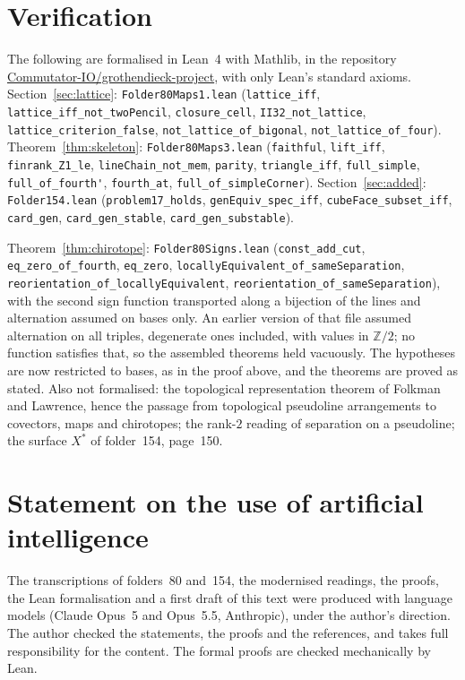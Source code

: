 \documentclass[11pt,a4paper]{amsart}
\theoremstyle{definition}
\theoremstyle{remark}
\begin{document}
\section{Verification}\label{sec:lean}
\begingroup\sloppy
The following are formalised in Lean~4 with Mathlib, in the repository \href{https://github.com/Commutator-IO/grothendieck-project}{Commutator-IO/grothendieck-project}, with only Lean's standard axioms. Section~\ref{sec:lattice}: \nolinkurl{Folder80Maps1.lean} (\nolinkurl{lattice_iff}, \nolinkurl{lattice_iff_not_twoPencil}, \nolinkurl{closure_cell}, \nolinkurl{II32_not_lattice}, \nolinkurl{lattice_criterion_false}, \nolinkurl{not_lattice_of_bigonal}, \nolinkurl{not_lattice_of_four}). Theorem~\ref{thm:skeleton}: \nolinkurl{Folder80Maps3.lean} (\nolinkurl{faithful}, \nolinkurl{lift_iff}, \nolinkurl{finrank_Z1_le}, \nolinkurl{lineChain_not_mem}, \nolinkurl{parity}, \nolinkurl{triangle_iff}, \nolinkurl{full_simple}, \nolinkurl{full_of_fourth'}, \nolinkurl{fourth_at}, \nolinkurl{full_of_simpleCorner}). Section~\ref{sec:added}: \nolinkurl{Folder154.lean} (\nolinkurl{problem17_holds}, \nolinkurl{genEquiv_spec_iff}, \nolinkurl{cubeFace_subset_iff}, \nolinkurl{card_gen}, \nolinkurl{card_gen_stable}, \nolinkurl{card_gen_substable}).

Theorem~\ref{thm:chirotope}: \nolinkurl{Folder80Signs.lean} (\nolinkurl{const_add_cut}, \nolinkurl{eq_zero_of_fourth}, \nolinkurl{eq_zero}, \nolinkurl{locallyEquivalent_of_sameSeparation}, \nolinkurl{reorientation_of_locallyEquivalent}, \nolinkurl{reorientation_of_sameSeparation}), with the second sign function transported along a bijection of the lines and alternation assumed on bases only. An earlier version of that file assumed alternation on all triples, degenerate ones included, with values in $\mathbb Z/2$; no function satisfies that, so the assembled theorems held vacuously. The hypotheses are now restricted to bases, as in the proof above, and the theorems are proved as stated. Also not formalised: the topological representation theorem of Folkman and Lawrence, hence the passage from topological pseudoline arrangements to covectors, maps and chirotopes; the rank-$2$ reading of separation on a pseudoline; the surface $X^*$ of folder~154, page~150.
\endgroup

\section*{Statement on the use of artificial intelligence}
The transcriptions of folders~80 and~154, the modernised readings, the proofs, the Lean formalisation and a first draft of this text were produced with language models (Claude Opus~5 and Opus~5.5, Anthropic), under the author's direction. The author checked the statements, the proofs and the references, and takes full responsibility for the content. The formal proofs are checked mechanically by Lean.
\end{document}
